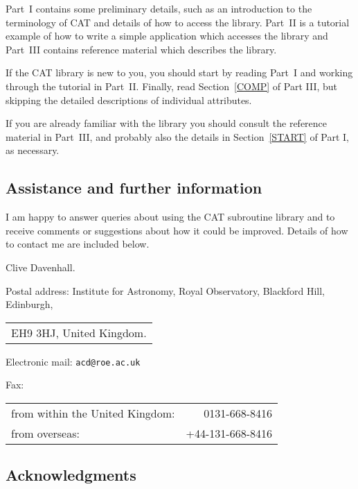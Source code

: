 Part~I contains some preliminary details, such as an introduction to
the terminology of CAT and details of how to access the library.
Part~II is a tutorial example of how to write a simple application which
accesses the library and Part~III contains reference material which
describes the library.

If the CAT library is new to you, you should start by reading Part~I
and working through the tutorial in Part~II. Finally, read
Section~\ref{COMP} of Part III, but skipping the detailed descriptions
of individual attributes.

If you are already familiar with the library you should consult the
reference material in Part~III, and probably also the details in
Section~\ref{START} of Part I, as necessary.


\subsection*{Assistance and further information}

I am happy to answer queries about using the CAT subroutine library
and to receive comments or suggestions about how it could be improved.
Details of how to contact me are included below.

\vspace{2mm}

Clive Davenhall.

\vspace{2mm}

Postal address: Institute for Astronomy, Royal Observatory, Blackford Hill,
Edinburgh, \\
\begin{tabular}{l}
EH9 3HJ, United Kingdom.  \\
\end{tabular}

Electronic mail: {\tt acd@roe.ac.uk}

Fax: \\
\begin{tabular}{lr}
from within the United Kingdom: &    0131-668-8416 \\
from overseas:                  & +44-131-668-8416 \\
\end{tabular}

\vspace*{\fill}
\stardoccopyright

\newpage
\subsection*{Acknowledgments}

